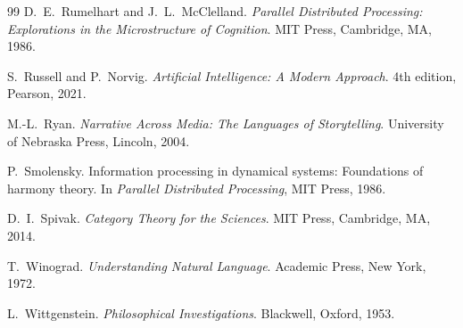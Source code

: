 \documentclass[12pt, a4paper]{article}
\begin{document}
\begin{thebibliography}{99}
D.~E.~Rumelhart and J.~L.~McClelland.
\newblock \textit{Parallel Distributed Processing: Explorations in the Microstructure of Cognition}.
\newblock MIT Press, Cambridge, MA, 1986.

S.~Russell and P.~Norvig.
\newblock \textit{Artificial Intelligence: A Modern Approach}.
\newblock 4th edition, Pearson, 2021.

M.-L.~Ryan.
\newblock \textit{Narrative Across Media: The Languages of Storytelling}.
\newblock University of Nebraska Press, Lincoln, 2004.

P.~Smolensky.
\newblock Information processing in dynamical systems: Foundations of harmony theory.
\newblock In \textit{Parallel Distributed Processing}, MIT Press, 1986.

D.~I.~Spivak.
\newblock \textit{Category Theory for the Sciences}.
\newblock MIT Press, Cambridge, MA, 2014.

T.~Winograd.
\newblock \textit{Understanding Natural Language}.
\newblock Academic Press, New York, 1972.

L.~Wittgenstein.
\newblock \textit{Philosophical Investigations}.
\newblock Blackwell, Oxford, 1953.

\end{thebibliography}
\end{document}
